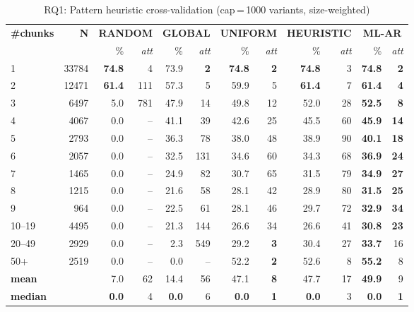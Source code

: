 \begin{table}[ht]
\centering
\caption{RQ1: Pattern heuristic cross-validation (cap\,=\,1000 variants, size-weighted)}
\label{tab:rq1--sz}
\begin{tabular}{lr|rr|rr|rr|rr|rr}
\hline
\textbf{\#chunks} & \textbf{N} & \multicolumn{2}{c|}{\textbf{RANDOM}} & \multicolumn{2}{c|}{\textbf{GLOBAL}} & \multicolumn{2}{c|}{\textbf{UNIFORM}} & \multicolumn{2}{c|}{\textbf{HEURISTIC}} & \multicolumn{2}{c}{\textbf{ML-AR}} \\
 &  & \% & \textit{att} & \% & \textit{att} & \% & \textit{att} & \% & \textit{att} & \% & \textit{att} \\
\hline
1 & 33784 & \textbf{74.8} & 4 & 73.9 & \textbf{2} & \textbf{74.8} & \textbf{2} & \textbf{74.8} & 3 & \textbf{74.8} & \textbf{2} \\
2 & 12471 & \textbf{61.4} & 111 & 57.3 & 5 & 59.9 & 5 & \textbf{61.4} & 7 & \textbf{61.4} & \textbf{4} \\
3 & 6497 & 5.0 & 781 & 47.9 & 14 & 49.8 & 12 & 52.0 & 28 & \textbf{52.5} & \textbf{8} \\
4 & 4067 & 0.0 & -- & 41.1 & 39 & 42.6 & 25 & 45.5 & 60 & \textbf{45.9} & \textbf{14} \\
5 & 2793 & 0.0 & -- & 36.3 & 78 & 38.0 & 48 & 38.9 & 90 & \textbf{40.1} & \textbf{18} \\
6 & 2057 & 0.0 & -- & 32.5 & 131 & 34.6 & 60 & 34.3 & 68 & \textbf{36.9} & \textbf{24} \\
7 & 1465 & 0.0 & -- & 24.9 & 82 & 30.7 & 65 & 31.5 & 79 & \textbf{34.9} & \textbf{27} \\
8 & 1215 & 0.0 & -- & 21.6 & 58 & 28.1 & 42 & 28.9 & 80 & \textbf{31.5} & \textbf{25} \\
9 & 964 & 0.0 & -- & 22.5 & 61 & 28.1 & 46 & 29.7 & 72 & \textbf{32.9} & \textbf{34} \\
10--19 & 4495 & 0.0 & -- & 21.3 & 144 & 26.6 & 34 & 26.6 & 41 & \textbf{30.8} & \textbf{23} \\
20--49 & 2929 & 0.0 & -- & 2.3 & 549 & 29.2 & \textbf{3} & 30.4 & 27 & \textbf{33.7} & 16 \\
50+ & 2519 & 0.0 & -- & 0.0 & -- & 52.2 & \textbf{2} & 52.6 & 8 & \textbf{55.2} & 8 \\
\hline
\textbf{mean} &  & 7.0 & 62 & 14.4 & 56 & 47.1 & \textbf{8} & 47.7 & 17 & \textbf{49.9} & 9 \\
\textbf{median} &  & \textbf{0.0} & 4 & \textbf{0.0} & 6 & \textbf{0.0} & \textbf{1} & \textbf{0.0} & 3 & \textbf{0.0} & \textbf{1} \\
\hline
\end{tabular}
\end{table}
